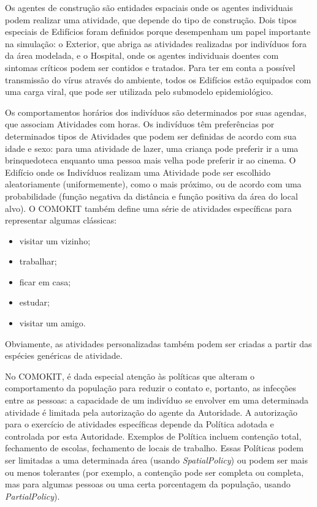 
Os agentes de construção são entidades espaciais onde os agentes individuais podem realizar uma atividade, que depende do tipo de construção. Dois tipos especiais de Edifícios foram definidos porque desempenham um papel importante na simulação: o Exterior, que abriga as atividades realizadas por indivíduos fora da área modelada, e o Hospital, onde os agentes individuais doentes com sintomas críticos podem ser contidos e tratados. Para ter em conta a possível transmissão do vírus através do ambiente, todos os Edifícios estão equipados com uma carga viral, que pode ser utilizada pelo submodelo epidemiológico. \cite{ArtigoComokit:online}

Os comportamentos horários dos indivíduos são determinados por suas agendas, que associam Atividades com horas. Os indivíduos têm preferências por determinados tipos de Atividades que podem ser definidas de acordo com sua idade e sexo: para uma atividade de lazer, uma criança pode preferir ir a uma brinquedoteca enquanto uma pessoa mais velha pode preferir ir ao cinema. O Edifício onde os Indivíduos realizam uma Atividade pode ser escolhido aleatoriamente (uniformemente), como o mais próximo, ou de acordo com uma probabilidade (função negativa da distância e função positiva da área do local alvo). O COMOKIT também define uma série de atividades específicas para representar algumas clássicas: 
\begin{itemize}
\item visitar um vizinho;
\item trabalhar;
\item ficar em casa;
\item estudar;
\item visitar um amigo.
\end{itemize}

Obviamente, as atividades personalizadas também podem ser criadas a partir das espécies genéricas de atividade. \cite{ArtigoComokit:online}

No COMOKIT, é dada especial atenção às políticas que alteram o comportamento da população para reduzir o contato e, portanto, as infecções entre as pessoas: a capacidade de um indivíduo se envolver em uma determinada atividade é limitada pela autorização do agente da Autoridade. A autorização para o exercício de atividades específicas depende da Política adotada e controlada por esta Autoridade. Exemplos de Política incluem contenção total, fechamento de escolas, fechamento de locais de trabalho. Essas Políticas podem ser limitadas a uma determinada área (usando \textit{SpatialPolicy}) ou podem ser mais ou menos tolerantes (por exemplo, a contenção pode ser completa ou completa, mas para algumas pessoas ou uma certa porcentagem da população, usando \textit{PartialPolicy}). \cite{ArtigoComokit:online}

